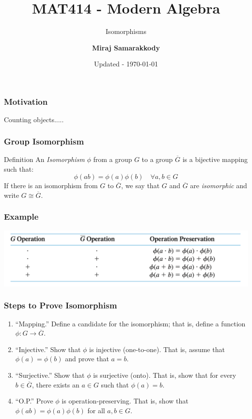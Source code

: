 \documentclass{beamer}
\title{MAT414 - Modern Algebra}
\subtitle{Isomorphisms \cite{JAG2017}}
\author{\textbf{Miraj Samarakkody}}
\institute{Tougaloo College}
\date{Updated - \today}
\begin{document}
\begin{frame}
    \titlepage
\end{frame}




\begin{frame}
    \frametitle{Motivation}

    Counting objects..... 

\end{frame}

\begin{frame}
    \frametitle{Group Isomorphism}

    \begin{block}{Definition}
        An \textit{Isomorphism} \(\phi\) from a group \(G\) to a group \(\overline{G}\) is a bijective mapping such that:
        \[
            \phi(ab) = \phi(a)\phi(b) \quad \forall a,b \in G
        \]
        If there is an isomorphism from \(G\) to \(\overline{G}\), we say that \(G\) and \(\overline{G}\) are \textit{isomorphic} and write \(G \cong \overline{G}\).
    \end{block}

\end{frame}

\begin{frame}
    \frametitle{Example}

    \includegraphics[scale=0.6]{Figures/fig_6.png}

\end{frame}

\begin{frame}
    \frametitle{Steps to Prove Isomorphism}

    \begin{enumerate}
        \item ``Mapping.'' Define a candidate for the isomorphism; that is, define a function \(\phi: G \to \overline{G}\).\pause
        \item ``Injective.'' Show that \(\phi\) is injective (one-to-one). That is, assume that \(\phi(a)=\phi(b)\) and prove that \(a=b\).\pause 
        \item ``Surjective.'' Show that \(\phi\) is surjective (onto). That is, show that for every \(b \in \overline{G}\), there exists an \(a \in G\) such that \(\phi(a)=b\).\pause
        \item ``O.P.'' Prove \(\phi\) is operation-preserving. That is, show that \(\phi(ab)=\phi(a)\phi(b)\) for all \(a,b \in G\).
    \end{enumerate}

\end{frame}
\end{document}
